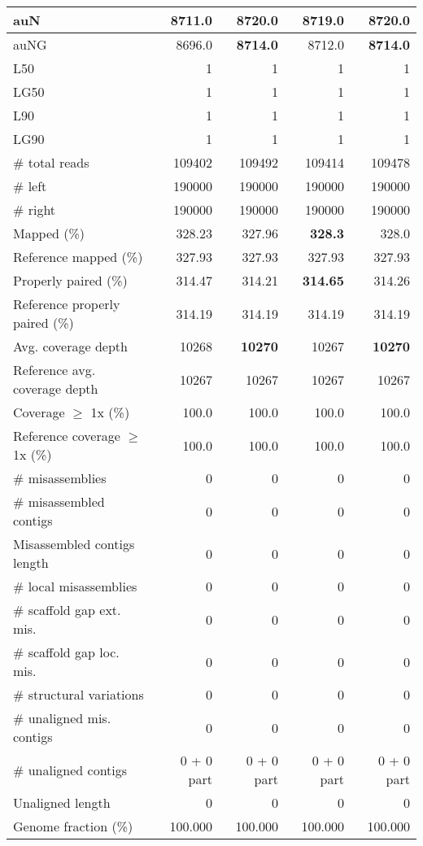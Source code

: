 \documentclass[12pt,a4paper]{article}
\begin{document}
\begin{table}[ht]
\begin{center}
\begin{tabular}{|l*{4}{|r}|}
auN & 8711.0 & {\bf 8720.0} & 8719.0 & {\bf 8720.0} \\ \hline
auNG & 8696.0 & {\bf 8714.0} & 8712.0 & {\bf 8714.0} \\ \hline
L50 & 1 & 1 & 1 & 1 \\ \hline
LG50 & 1 & 1 & 1 & 1 \\ \hline
L90 & 1 & 1 & 1 & 1 \\ \hline
LG90 & 1 & 1 & 1 & 1 \\ \hline
\# total reads & 109402 & 109492 & 109414 & 109478 \\ \hline
\# left & 190000 & 190000 & 190000 & 190000 \\ \hline
\# right & 190000 & 190000 & 190000 & 190000 \\ \hline
Mapped (\%) & 328.23 & 327.96 & {\bf 328.3} & 328.0 \\ \hline
Reference mapped (\%) & 327.93 & 327.93 & 327.93 & 327.93 \\ \hline
Properly paired (\%) & 314.47 & 314.21 & {\bf 314.65} & 314.26 \\ \hline
Reference properly paired (\%) & 314.19 & 314.19 & 314.19 & 314.19 \\ \hline
Avg. coverage depth & 10268 & {\bf 10270} & 10267 & {\bf 10270} \\ \hline
Reference avg. coverage depth & 10267 & 10267 & 10267 & 10267 \\ \hline
Coverage $\geq$ 1x (\%) & 100.0 & 100.0 & 100.0 & 100.0 \\ \hline
Reference coverage $\geq$ 1x (\%) & 100.0 & 100.0 & 100.0 & 100.0 \\ \hline
\# misassemblies & 0 & 0 & 0 & 0 \\ \hline
\# misassembled contigs & 0 & 0 & 0 & 0 \\ \hline
Misassembled contigs length & 0 & 0 & 0 & 0 \\ \hline
\# local misassemblies & 0 & 0 & 0 & 0 \\ \hline
\# scaffold gap ext. mis. & 0 & 0 & 0 & 0 \\ \hline
\# scaffold gap loc. mis. & 0 & 0 & 0 & 0 \\ \hline
\# structural variations & 0 & 0 & 0 & 0 \\ \hline
\# unaligned mis. contigs & 0 & 0 & 0 & 0 \\ \hline
\# unaligned contigs & 0 + 0 part & 0 + 0 part & 0 + 0 part & 0 + 0 part \\ \hline
Unaligned length & 0 & 0 & 0 & 0 \\ \hline
Genome fraction (\%) & 100.000 & 100.000 & 100.000 & 100.000 \\ \hline

\end{tabular}
\end{center}
\end{table}
\end{document}
